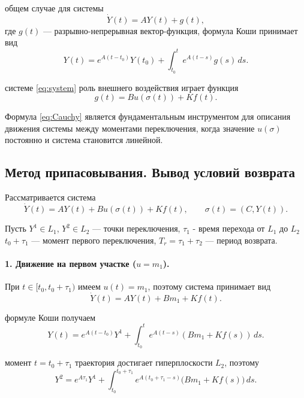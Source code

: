 \documentclass[12pt,a4paper]{article}
\theoremstyle{bigplain}
\theoremstyle{plain}
\begin{document}
 общем случае для системы
\[
\dot Y(t)=AY(t)+g(t),
\]
где $g(t)$ — разрывно-непрерывная вектор-функция, формула Коши принимает вид
\begin{equation}
Y(t)
=
e^{A(t-t_0)}Y(t_0)
+
\int_{t_0}^{t} e^{A(t-s)}g(s)\,ds.
\tag{1.3}
\label{eq:Cauchy}
\end{equation}

 системе \eqref{eq:system} роль внешнего воздействия играет функция
\[
g(t)=Bu(\sigma(t))+Kf(t).
\]

Формула \eqref{eq:Cauchy} является фундаментальным инструментом
для описания движения системы между моментами переключения,
когда значение $u(\sigma)$ постоянно и система становится линейной.


\subsection*{Метод припасовывания. Вывод условий возврата}

Рассматривается система
\begin{equation*}
\dot Y(t)=AY(t)+Bu(\sigma(t))+Kf(t),
\qquad
\sigma(t)=(C,Y(t)).
\end{equation*}

Пусть $Y^{1}\in L_1$, $Y^{2}\in L_2$ — точки переключения, $\tau_1$ - время перехода от $L_1$ до $L_2$ \\
$t_0+\tau_1$ — момент первого переключения,
$T_r=\tau_1+\tau_2$ — период возврата.

\paragraph{1. Движение на первом участке ($u=m_1$).}

При $t\in[t_0,t_0+\tau_1)$ имеем $u(t)=m_1$, поэтому система принимает вид
\[
\dot Y(t)=AY(t)+Bm_1+Kf(t).
\]

 формуле Коши получаем
\begin{equation*}
Y(t)
=
e^{A(t-t_0)}Y^{1}
+
\int_{t_0}^{t}
e^{A(t-s)}(Bm_1+Kf(s))\,ds.
\end{equation*}

 момент $t=t_0+\tau_1$ траектория достигает гиперплоскости $L_2$, поэтому
\begin{equation}
Y^{2}
=
e^{A\tau_1}Y^{1}
+
\int_{t_0}^{t_0+\tau_1}
e^{A(t_0+\tau_1-s)}
\bigl(Bm_1+Kf(s)\bigr)\,ds.
\tag{1.4}
\label{eq:Y2_expression}
\end{equation}
\end{document}
